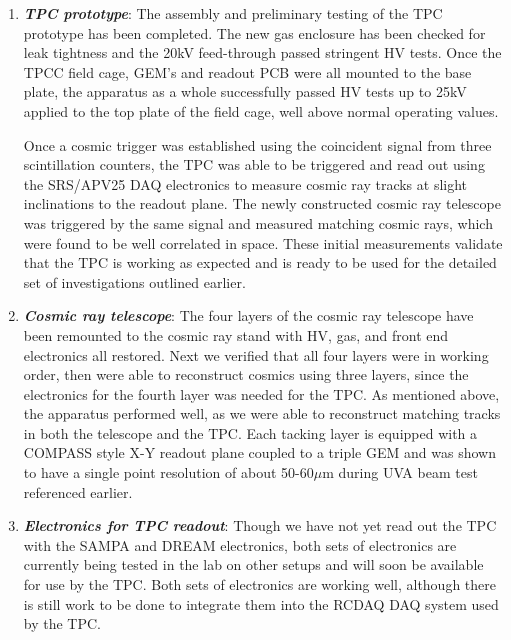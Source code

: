 
\begin{enumerate}

\item	\textbf{\emph{TPC prototype}}: The assembly and  preliminary testing of the TPC prototype has been completed. The new gas enclosure has been checked for leak tightness and the 20kV feed-through passed stringent HV tests. Once the TPCC field cage, GEM's and readout PCB were all mounted to the base plate, the apparatus as a whole successfully passed HV tests up to 25kV applied to the top plate of the field cage, well above normal operating values. 

Once a cosmic trigger was established using the coincident signal from three scintillation counters, the TPC was able to be triggered and read out using the SRS/APV25 DAQ electronics to measure cosmic ray tracks at slight inclinations to the readout plane. The newly constructed cosmic ray telescope was triggered by the same signal and measured matching cosmic rays, which were found to be well correlated in space. These initial measurements validate that the TPC is working as expected and is ready to be used for the detailed set of investigations outlined earlier. 
 
\item	\textbf{\emph{Cosmic ray telescope}}: The four layers of the cosmic ray telescope have been remounted to the cosmic ray stand with HV, gas, and front end electronics all restored. Next we verified that all four layers were in working order, then were able to reconstruct cosmics using three layers, since the electronics for the fourth layer was needed for the TPC. As mentioned above, the apparatus performed well, as we were able to reconstruct matching tracks in both the telescope and the TPC. Each tacking layer is equipped with a COMPASS style X-Y readout plane coupled to a triple GEM and was shown to have a single point resolution of about 50-60$\mu$m during UVA beam test referenced earlier.   

\item	\textbf{\emph{Electronics for TPC readout}}: Though we have not yet read out the TPC with the SAMPA and DREAM electronics, both sets of electronics are currently being tested in the lab on other setups and will soon be available for use by the TPC. Both sets of electronics are working well, although there is still work to be done to integrate them into the RCDAQ DAQ system used by the TPC. 


\end{enumerate}
